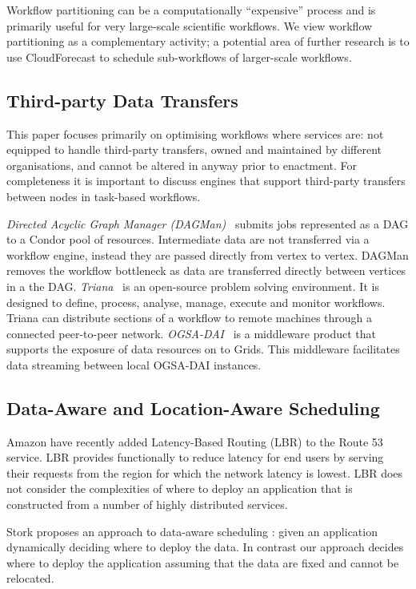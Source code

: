 \documentclass[10pt, conference, compsocconf]{IEEEtran}
\newcommand{\sysname}{CloudForecast\xspace}
\begin{document}
Workflow partitioning can be a computationally ``expensive'' process and is primarily useful for very large-scale scientific workflows. We view workflow partitioning as a complementary activity; a potential area of further research is to use \sysname to schedule sub-workflows of larger-scale workflows.


\subsection{Third-party Data Transfers} \label{section:third}

This paper focuses primarily on optimising workflows where services are: not equipped to handle third-party transfers, owned and maintained by different organisations, and cannot be altered in anyway prior to enactment. For completeness it is important to discuss engines that support third-party transfers between nodes in task-based workflows.

\emph{Directed Acyclic Graph Manager (DAGMan)}~\cite{dagman} submits jobs represented as a DAG to a Condor pool of resources. Intermediate data are not transferred  via a workflow engine, instead they are passed directly from vertex to vertex. DAGMan removes the workflow bottleneck as data are transferred directly between vertices in a the DAG. \emph{Triana}~\cite{triana} is an open-source problem solving environment. It is designed to define, process, analyse, manage, execute and monitor workflows. Triana can distribute sections of a workflow to remote machines through a connected peer-to-peer network. \emph{OGSA-DAI}~\cite{ogsa-dai} is a middleware product that supports the exposure of data resources on to Grids. This middleware facilitates data streaming between local OGSA-DAI instances.



\subsection{Data-Aware and Location-Aware Scheduling} \label{section:dataaware}

Amazon have recently added Latency-Based Routing (LBR) \cite{lbr} to the Route 53 service. LBR provides functionally to reduce latency for end users by serving their requests from the region for which the network latency is lowest. LBR does not consider the complexities of where to deploy an application that is constructed from a number of highly distributed services.

Stork proposes an approach to data-aware scheduling \cite{data_aware_scheduling}: given an application dynamically deciding where to deploy the data. In contrast our approach decides where to deploy the application assuming that the data are fixed and cannot be relocated.
\end{document}
